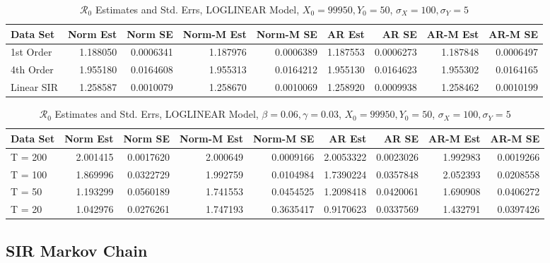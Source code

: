 \message{ !name(draft_v13.tex)}\documentclass[12pt]{article}
\newcommand{\rr}{\ensuremath{\mathcal{R}_0}}
\begin{document}
\begin{table}[H]
	
	\caption{\label{tab:}$\rr$ Estimates and Std. Errs, LOGLINEAR Model,
		$X_0 = 99950, Y_0 = 50$, $\sigma_X = 100, \sigma_Y = 5$}
	\centering
	\begin{footnotesize}
		\begin{tabular}[t]{l|r|r|r|r|r|r|r|r}
			\hline
			Data Set & Norm Est & Norm SE & Norm-M Est & Norm-M SE & AR Est & AR SE & AR-M Est & AR-M SE\\
			\hline
			1st Order & 1.188050 & 0.0006341 & 1.187976 & 0.0006389 & 1.187553 & 0.0006273 & 1.187848 & 0.0006497\\
			\hline
			4th Order & 1.955180 & 0.0164608 & 1.955313 & 0.0164212 & 1.955130 & 0.0164623 & 1.955302 & 0.0164165\\
			\hline
			Linear SIR & 1.258587 & 0.0010079 & 1.258670 & 0.0010069 & 1.258920 & 0.0009938 & 1.258462 & 0.0010199\\
			\hline
		\end{tabular}
	\end{footnotesize}
\end{table}

\begin{table}[H]
	
	\caption{\label{tab:}$\rr$ Estimates and Std. Errs, LOGLINEAR Model,
		$\beta = 0.06, \gamma = 0.03$, $X_0 = 99950, Y_0 = 50$, $\sigma_X = 100, \sigma_Y = 5$}
	\centering
	\begin{tabular}[t]{l|r|r|r|r|r|r|r|r}
		\hline
		Data Set & Norm Est & Norm SE & Norm-M Est & Norm-M SE & AR Est & AR SE & AR-M Est & AR-M SE\\
		\hline
		T = 200 & 2.001415 & 0.0017620 & 2.000649 & 0.0009166 & 2.0053322 & 0.0023026 & 1.992983 & 0.0019266\\
		\hline
		T = 100 & 1.869996 & 0.0322729 & 1.992759 & 0.0104984 & 1.7390224 & 0.0357848 & 2.052393 & 0.0208558\\
		\hline
		T = 50 & 1.193299 & 0.0560189 & 1.741553 & 0.0454525 & 1.2098418 & 0.0420061 & 1.690908 & 0.0406272\\
		\hline
		T = 20 & 1.042976 & 0.0276261 & 1.747193 & 0.3635417 & 0.9170623 & 0.0337569 & 1.432791 & 0.0397426\\
		\hline
	\end{tabular}
\end{table}

\subsection{SIR Markov Chain}
\end{document}
